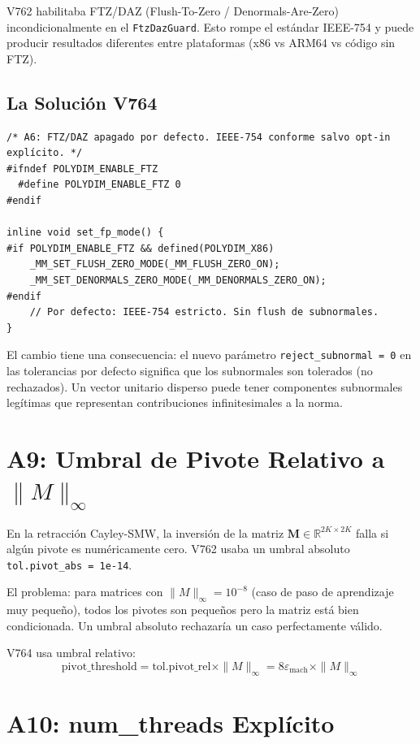 V762 habilitaba FTZ/DAZ (Flush-To-Zero / Denormals-Are-Zero) incondicionalmente
en el \texttt{FtzDazGuard}. Esto rompe el estándar IEEE-754 y puede producir
resultados diferentes entre plataformas (x86 vs ARM64 vs código sin FTZ).

\subsection{La Solución V764}

\begin{verbatim}
/* A6: FTZ/DAZ apagado por defecto. IEEE-754 conforme salvo opt-in explícito. */
#ifndef POLYDIM_ENABLE_FTZ
  #define POLYDIM_ENABLE_FTZ 0
#endif

inline void set_fp_mode() {
#if POLYDIM_ENABLE_FTZ && defined(POLYDIM_X86)
    _MM_SET_FLUSH_ZERO_MODE(_MM_FLUSH_ZERO_ON);
    _MM_SET_DENORMALS_ZERO_MODE(_MM_DENORMALS_ZERO_ON);
#endif
    // Por defecto: IEEE-754 estricto. Sin flush de subnormales.
}
\end{verbatim}

El cambio tiene una consecuencia: el nuevo parámetro \texttt{reject\_subnormal = 0}
en las tolerancias por defecto significa que los subnormales son tolerados (no rechazados).
Un vector unitario disperso puede tener componentes subnormales legítimas que representan
contribuciones infinitesimales a la norma.

\section{A9: Umbral de Pivote Relativo a $\|{M}\|_\infty$}

En la retracción Cayley-SMW, la inversión de la matriz $\mathbf{M} \in \mathbb{R}^{2K \times 2K}$
falla si algún pivote es numéricamente cero. V762 usaba un umbral absoluto
\texttt{tol.pivot\_abs = 1e-14}.

El problema: para matrices con $\|{M}\|_\infty = 10^{-8}$ (caso de paso de aprendizaje muy pequeño),
todos los pivotes son pequeños pero la matriz está bien condicionada. Un umbral absoluto
rechazaría un caso perfectamente válido.

V764 usa umbral relativo:
\begin{equation}
\text{pivot\_threshold} = \text{tol.pivot\_rel} \times \|{M}\|_\infty = 8\varepsilon_{\text{mach}} \times \|{M}\|_\infty
\end{equation}

\section{A10: num\_threads Explícito}

